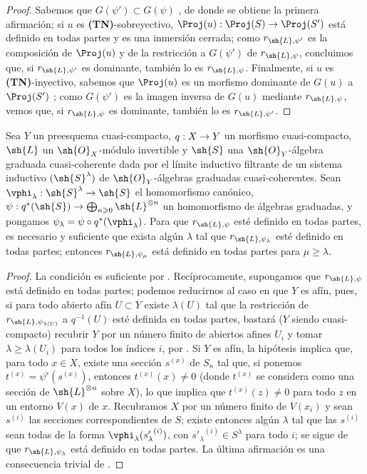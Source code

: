 \documentclass[oneside,10pt]{amsart}
\makeatletter
\renewcommand{\geq}{\geqslant}
\newcommand{\ega@arrow}[2]{\mathchoice{#1}{#2}{#2}{#2}}
\renewcommand{\to}{\ega@arrow{\longrightarrow}{\rightarrow}}
\let\EGAOriginalLabel\label
\renewcommand{\label}[1]{\phantomsection\EGAOriginalLabel{#1}}
\makeatother
\begin{document}
\begin{proof}
Sabemos que $G(\psi')\subset G(\psi)$ , de donde se obtiene la primera afirmación;
si $u$ es \textbf{(TN)}-sobreyectivo, $\Proj(u):\Proj(S)\to\Proj(S')$ está definido en todas partes y es una inmersión cerrada;
como $r_{\sh{L},\psi'}$ es la composición de $\Proj(u)$ y de la restricción a $G(\psi')$ de $r_{\sh{L},\psi}$, concluimos que, si $r_{\sh{L},\psi'}$ es dominante, también lo es $r_{\sh{L},\psi}$.
Finalmente, si $u$ es \textbf{(TN)}-inyectivo, sabemos que $\Proj(u)$ es un morfismo dominante de $G(u)$ a $\Proj(S')$ ;
como $G(\psi')$ es la imagen inversa de $G(u)$ mediante $r_{\sh{L},\psi}$, vemos que, si $r_{\sh{L},\psi}$ es dominante, también lo es $r_{\sh{L},\psi'}$.
\end{proof}

\begin{proposition}[3.7.7]
\label{II.3.7.7}
Sea $Y$ un preesquema cuasi-compacto, $q:X\to Y$ un morfismo cuasi-compacto, $\sh{L}$ un $\sh{O}_X$-módulo invertible y $\sh{S}$ una $\sh{O}_Y$-álgebra graduada cuasi-coherente dada por el límite inductivo filtrante de un sistema inductivo $(\sh{S}^\lambda)$ de $\sh{O}_Y$-álgebras graduadas cuasi-coherentes.
Sean $\vphi_\lambda:\sh{S}^\lambda\to\sh{S}$ el homomorfismo canónico, $\psi:q^*(\sh{S})\to\bigoplus_{n\geq0}\sh{L}^{\otimes n}$ un homomorfismo de álgebras graduadas, y pongamos $\psi_\lambda=\psi\circ q^*(\vphi_\lambda)$.
Para que $r_{\sh{L},\psi}$ esté definido en todas partes, es necesario y suficiente que exista algún $\lambda$ tal que $r_{\sh{L},\psi_\lambda}$ esté definido en todas partes;
entonces $r_{\sh{L},\psi_\mu}$ está definido en todas partes para $\mu\geq\lambda$.
\end{proposition}

\begin{proof}
La condición es suficiente por .
Recíprocamente, supongamos que $r_{\sh{L},\psi}$ está definido en todas partes;
podemos reducirnos al caso en que $Y$ es afín, pues, si para todo abierto afín $U\subset Y$ existe $\lambda(U)$ tal que la restricción de $r_{\sh{L},\psi_{\lambda(U)}}$ a $q^{-1}(U)$ esté definida en todas partes, bastará ($Y$ siendo cuasi-compacto) recubrir $Y$ por un número finito de abiertos afines $U_i$ y tomar $\lambda\geq\lambda(U_i)$ para todos los índices $i$, por .
Si $Y$ es afín, la hipótesis implica que, para todo $x\in X$, existe una sección $s^{(x)}$ de $S_n$ tal que, si ponemos $t^{(x)}=\psi^\flat(s^{(x)})$, entonces $t^{(x)}(x)\neq0$ (donde $t^{(x)}$ se considera como una sección de $\sh{L}^{\otimes n}$ sobre $X$), lo que implica que $t^{(x)}(z)\neq0$ para todo $z$ en un entorno $V(x)$ de $x$.
Recubramos $X$ por un número finito de $V(x_i)$ y sean $s^{(i)}$ las secciones correspondientes de $S$;
existe entonces algún $\lambda$ tal que las $s^{(i)}$ sean todas de la forma $\vphi_\lambda({s'_{\lambda}}^{(i)})$, con ${s'_{\lambda}}^{(i)}\in S^\lambda$ para todo $i$;
se sigue de  que $r_{\sh{L},\psi_\lambda}$ está definido en todas partes.
La última afirmación es una consecuencia trivial de .
\end{proof}
\end{document}
